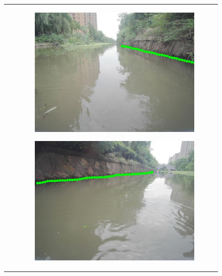 \documentclass[cn,12pt,color=mine,scheme=chinese,bibstyle=gb7714-2015]{elegantbook}
\begin{document}
\begin{figure}[!htp]
\begin{tabular}{cc}
		\rotatebox[x=2pt,y=58pt]{90}{预测结果} &  	
		\begin{subfigure}[b]{0.23\linewidth}
			\centering\includegraphics[width=\linewidth]{lane/test1res}
			\caption{\label{lane2:a}}
		\end{subfigure}
		\begin{subfigure}[b]{0.23\linewidth}
			\centering\includegraphics[width=\linewidth]{lane/test2res}\caption{\label{lane2:b}}
		\end{subfigure}
		\begin{subfigure}[b]{0.23\linewidth}

\end{subfigure}
\end{tabular}
\end{figure}
\end{document}
